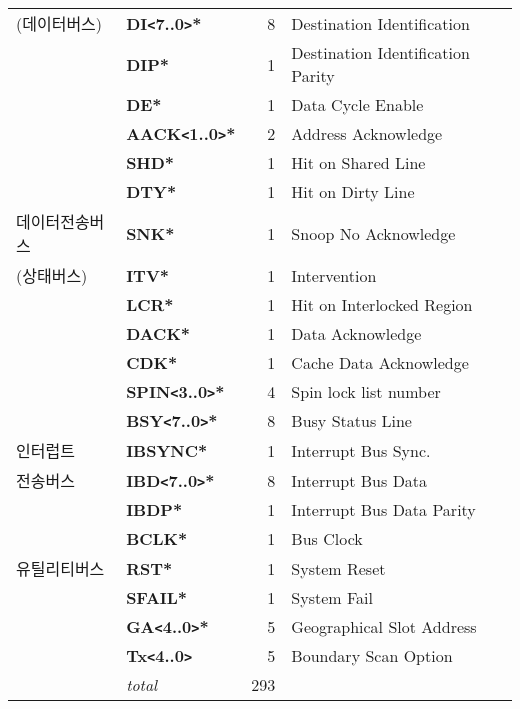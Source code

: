 \begin{table}[htbp]
\begin{center}
\begin{tabular}{|l|l|r|l|}
(데이터버스)  & {\bf DI{\tt <}7..0{\tt >}*}     & 8 & Destination Identification \\
         & {\bf DIP*}                      & 1 & Destination Identification Parity \\
         & {\bf DE*}                       & 1 & Data Cycle Enable \\ \hline
        & {\bf AACK{\tt <}1..0{\tt >}*}   & 2 & Address Acknowledge \\
        & {\bf SHD*}                      & 1 & Hit on Shared Line \\
        & {\bf DTY*}                      & 1 & Hit on Dirty Line \\
데이터전송버스 & {\bf SNK*}                      & 1 & Snoop No Acknowledge \\
(상태버스)  & {\bf ITV*}                      & 1 & Intervention \\
        & {\bf LCR*}                      & 1 & Hit on Interlocked Region \\
        & {\bf DACK*}                     & 1 & Data Acknowledge \\
        & {\bf CDK*}                      & 1 & Cache Data Acknowledge \\
        & {\bf SPIN{\tt <}3..0{\tt >}*}   & 4 & Spin lock list number \\
        & {\bf BSY{\tt <}7..0{\tt >}*}    & 8 & Busy Status Line \\ \hline    
인터럽트 & {\bf IBSYNC*}                   & 1 & Interrupt Bus Sync. \\
전송버스 & {\bf IBD{\tt <}7..0{\tt >}*}    & 8 & Interrupt Bus Data \\
     & {\bf IBDP*}                     & 1 & Interrupt Bus Data Parity \\ \hline
       & {\bf BCLK*}   & 1 & Bus Clock \\
유틸리티버스 & {\bf RST*}                      & 1 & System Reset \\
       & {\bf SFAIL*}                    & 1 & System Fail \\
       & {\bf GA{\tt <}4..0{\tt >}*}     & 5 & Geographical Slot Address \\
       & {\bf Tx{\tt <}4..0{\tt >}}     & 5 & Boundary Scan Option \\ \hline
       & {\it total\/} & 293 & \\
\hline
   \end{tabular}
\endgroup
   \end{center}
\end{table}
%
%

